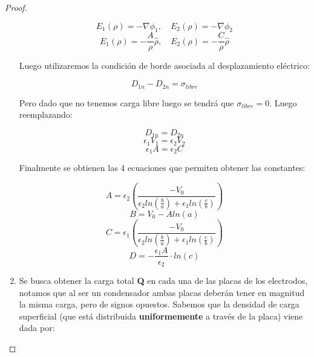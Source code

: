 \begin{proof}
\begin{enumerate}
        \begin{equation}
            E_{1}(\rho) = -\nabla\phi_{1}, \quad E_{2}(\rho) = -\nabla\phi_{2}
        \end{equation}
        \begin{equation}
            E_{1}(\rho) =-\frac{A}{\rho} \hat{\rho}, \quad E_{2}(\rho) = -\frac{C}{\rho} \hat{\rho}
        \end{equation}
        
        Luego utilizaremos la condición de borde asociada al desplazamiento eléctrico:
        
        \begin{equation}
            D_{1n} - D_{2n} = \sigma_{libre}
        \end{equation}
        
        Pero dado que no tenemos carga libre luego se tendrá que $\sigma_{libre}= 0$. Luego reemplazando:
        
        \begin{equation}
             D_{1n} = D_{2n}
        \end{equation}
        \begin{equation}
             \epsilon_{1}V_{1} = \epsilon_{2}V_{2}
        \end{equation}
        \begin{equation}
             \epsilon_{1}A = \epsilon_{2}C
        \end{equation}
        
        Finalmente se obtienen las 4 ecuaciones que permiten obtener las constantes:
        
        \begin{equation}
        A= \epsilon_{2}\left(\frac{-V_{0} }{\epsilon_{2}ln(\frac{b}{a}) + \epsilon_{1}ln(\frac{c}{b})}\right)
        \end{equation}
        \begin{equation}
        B = V_{0} - Aln(a)
        \end{equation}
        \begin{equation}
        C = \epsilon_{1}\left(\frac{-V_{0}}{\epsilon_{2}ln(\frac{b}{a}) + \epsilon_{1}ln(\frac{c}{b})}\right)
        \end{equation}
        \begin{equation}
        D=-\frac{\epsilon_{1}A}{\epsilon_{2}}\cdot ln(c)
        \end{equation}
    \item Se busca obtener la carga total \textbf{Q} en cada una de las placas de los electrodos, notamos que al ser un condensador ambas placas deberán tener en magnitud la misma carga, pero de signos opuestos. Sabemos que la densidad de carga superficial (que está distribuida\textbf{ uniformemente} a través de la placa) viene dada por:


\end{enumerate}
\end{proof}
